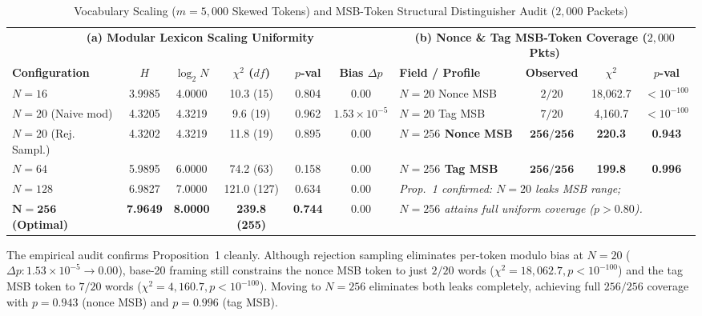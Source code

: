 \documentclass[conference]{IEEEtran}
\begin{document}
\begin{table}[t]
\caption{Vocabulary Scaling ($m=5{,}000$ Skewed Tokens) and MSB-Token Structural Distinguisher Audit ($2{,}000$ Packets)}
\label{tab:scaling}
\centering
\begin{tabular}{lccccc|lccc}
\toprule
\multicolumn{6}{c|}{\textbf{(a) Modular Lexicon Scaling Uniformity}} & \multicolumn{4}{c}{\textbf{(b) Nonce \& Tag MSB-Token Coverage ($2{,}000$ Pkts)}} \\
\textbf{Configuration} & \textbf{$H$} & \textbf{$\log_2 N$} & \textbf{$\chi^2$ ($df$)} & \textbf{$p$-val} & \textbf{Bias $\Delta p$} & \textbf{Field / Profile} & \textbf{Observed} & \textbf{$\chi^2$} & \textbf{$p$-val} \\
\midrule
$N=16$ & 3.9985 & 4.0000 & 10.3 (15) & 0.804 & $0.00$ & $N=20$ Nonce MSB & $2 / 20$ & 18,062.7 & $<10^{-100}$ \\
$N=20$ (Naive mod) & 4.3205 & 4.3219 & 9.6 (19) & 0.962 & $1.53\times 10^{-5}$ & $N=20$ Tag MSB & $7 / 20$ & 4,160.7 & $<10^{-100}$ \\
$N=20$ (Rej. Sampl.) & 4.3202 & 4.3219 & 11.8 (19) & 0.895 & $0.00$ & \textbf{$N=256$ Nonce MSB} & $\mathbf{256 / 256}$ & \textbf{220.3} & \textbf{0.943} \\
$N=64$ & 5.9895 & 6.0000 & 74.2 (63) & 0.158 & $0.00$ & \textbf{$N=256$ Tag MSB} & $\mathbf{256 / 256}$ & \textbf{199.8} & \textbf{0.996} \\
$N=128$ & 6.9827 & 7.0000 & 121.0 (127) & 0.634 & $0.00$ & \multicolumn{4}{l}{\textit{Prop.~1 confirmed: $N=20$ leaks MSB range;}} \\
$\mathbf{N=256}$ \textbf{(Optimal)} & \textbf{7.9649} & \textbf{8.0000} & \textbf{239.8 (255)} & \textbf{0.744} & $\mathbf{0.00}$ & \multicolumn{4}{l}{\textit{$N=256$ attains full uniform coverage ($p > 0.80$).}} \\
\bottomrule
\end{tabular}
\end{table}

The empirical audit confirms Proposition~1 cleanly. Although rejection sampling eliminates per-token modulo bias at $N=20$ ($\Delta p: 1.53\times 10^{-5} \to 0.00$), base-20 framing still constrains the nonce MSB token to just $2/20$ words ($\chi^2 = 18{,}062.7, p < 10^{-100}$) and the tag MSB token to $7/20$ words ($\chi^2 = 4{,}160.7, p < 10^{-100}$). Moving to $N=256$ eliminates both leaks completely, achieving full $256/256$ coverage with $p = 0.943$ (nonce MSB) and $p = 0.996$ (tag MSB).
\end{document}
